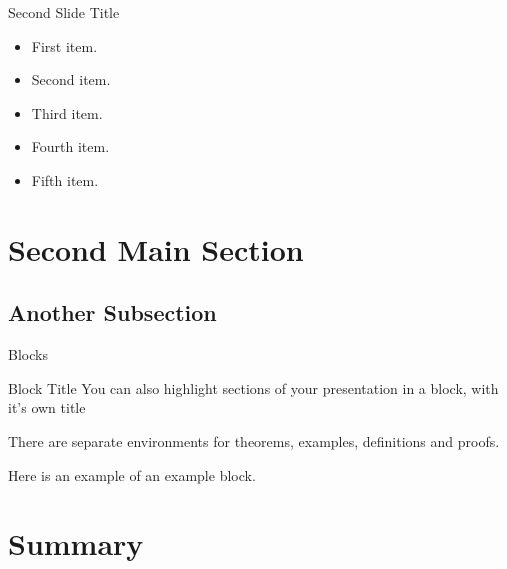 \documentclass[
  UTF8, %
  aspectratio=43, %
  11pt, %
]{presentation}
\begin{document}
\begin{frame}{Second Slide Title}
  \begin{itemize}
    \item {
          First item.
          \pause %
          }
    \item {
          Second item.
          }
    \item<3-> {
          Third item.
          }
    \item<4-> {
          Fourth item.
          }
    \item<5-> {
          Fifth item. 
          }
  \end{itemize}
\end{frame}

\section{Second Main Section}

\subsection{Another Subsection}

\begin{frame}{Blocks}
  \begin{block}{Block Title}
    You can also highlight sections of your presentation in a block, with it's own title
  \end{block}
  \begin{theorem}
    There are separate environments for theorems, examples, definitions and proofs.
  \end{theorem}
  \begin{example}
    Here is an example of an example block.
  \end{example}
\end{frame}

\section*{Summary}
\end{document}
